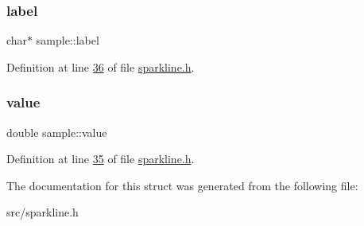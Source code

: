 \subsubsection{\texorpdfstring{label}{label}}
{\footnotesize\ttfamily char$\ast$ sample\+::label}



Definition at line \hyperlink{sparkline_8h_source_l00036}{36} of file \hyperlink{sparkline_8h_source}{sparkline.\+h}.

\mbox{\label{structsample_a51254f3a30c9fb41161471af0124b738}} 
\subsubsection{\texorpdfstring{value}{value}}
{\footnotesize\ttfamily double sample\+::value}



Definition at line \hyperlink{sparkline_8h_source_l00035}{35} of file \hyperlink{sparkline_8h_source}{sparkline.\+h}.



The documentation for this struct was generated from the following file\+:\begin{DoxyCompactItemize}
\item 
src/sparkline.\+h\end{DoxyCompactItemize}
